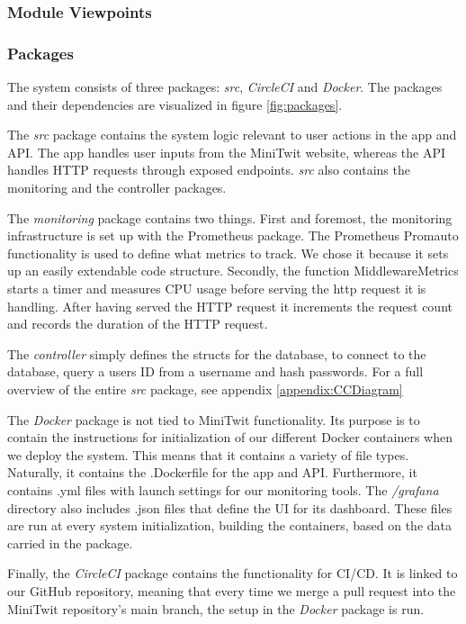 \subsubsection{Module Viewpoints}
\subsubsection*{Packages}

The system consists of three packages: \textit{src}, \textit{CircleCI} and \textit{Docker}. The packages and their dependencies are visualized in figure \ref{fig:packages}.

The \textit{src} package contains the system logic relevant to user actions in the app and API. The app handles user inputs from the MiniTwit website, whereas the API handles HTTP requests through exposed endpoints. \textit{src} also contains the monitoring and the controller packages.

The \textit{monitoring} package contains two things. First and foremost, the monitoring infrastructure is set up with the Prometheus package.
The Prometheus Promauto functionality is used to define what metrics to track. We chose it because it sets up an easily extendable code structure.
Secondly, the function MiddlewareMetrics starts a timer and measures CPU usage before serving the http request it is handling. After having served the HTTP request it increments the request count and records the duration of the HTTP request. 

The \textit{controller} simply defines the structs for the database, to connect to the database, query a users ID from a username and hash passwords.
\newline
For a full overview of the entire \textit{src} package, see appendix \ref{appendix:CCDiagram}

The \textit{Docker} package is not tied to MiniTwit functionality. Its purpose is to contain the instructions for initialization of our different Docker containers when we deploy the system. This means that it contains a variety of file types. Naturally, it contains the .Dockerfile for the app and API. Furthermore, it contains .yml files with launch settings for our monitoring tools. The \textit{/grafana} directory also includes .json files that define the UI for its dashboard. \newline
These files are run at every system initialization, building the containers, based on the data carried in the package.

Finally, the \textit{CircleCI} package contains the functionality for CI/CD. It is linked to our GitHub repository, meaning that every time we merge a pull request into the MiniTwit repository's main branch, the setup in the \textit{Docker} package is run.

